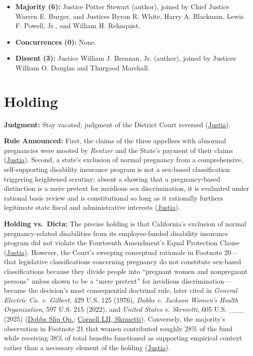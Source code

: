 \documentclass[12pt]{article}
\begin{document}
\begin{itemize}
  \item \textbf{Majority (6):} Justice Potter Stewart (author), joined by Chief Justice Warren E. Burger, and Justices Byron R. White, Harry A. Blackmun, Lewis F. Powell, Jr., and William H. Rehnquist.
  \item \textbf{Concurrences (0):} None.
  \item \textbf{Dissent (3):} Justice William J. Brennan, Jr. (author), joined by Justices William O. Douglas and Thurgood Marshall.
\end{itemize}

\section{Holding}

\textbf{Judgment:} Stay vacated; judgment of the District Court reversed (\href{https://supreme.justia.com/cases/federal/us/417/484/}{Justia}).

\textbf{Rule Announced:} First, the claims of the three appellees with abnormal pregnancies were mooted by \textit{Rentzer} and the State's payment of their claims (\href{https://supreme.justia.com/cases/federal/us/417/484/}{Justia}). Second, a state's exclusion of normal pregnancy from a comprehensive, self-supporting disability insurance program is not a sex-based classification triggering heightened scrutiny; absent a showing that a pregnancy-based distinction is a mere pretext for invidious sex discrimination, it is evaluated under rational basis review and is constitutional so long as it rationally furthers legitimate state fiscal and administrative interests (\href{https://supreme.justia.com/cases/federal/us/417/484/}{Justia}).

\textbf{Holding vs.\ Dicta:} The precise holding is that California's exclusion of normal pregnancy-related disabilities from its employee-funded disability insurance program did not violate the Fourteenth Amendment's Equal Protection Clause (\href{https://supreme.justia.com/cases/federal/us/417/484/}{Justia}). However, the Court's sweeping conceptual rationale in Footnote 20---that legislative classifications concerning pregnancy do not constitute sex-based classifications because they divide people into ``pregnant women and nonpregnant persons'' unless shown to be a ``mere pretext'' for invidious discrimination---became the decision's most consequential doctrinal rule, later cited in \textit{General Electric Co. v. Gilbert}, 429 U.S. 125 (1976), \textit{Dobbs v. Jackson Women's Health Organization}, 597 U.S. 215 (2022), and \textit{United States v. Skrmetti}, 605 U.S. \_\_\_ (2025) (\href{https://www.supremecourt.gov/opinions/21pdf/19-1392_6j37.pdf}{Dobbs Slip Op.}; \href{https://www.law.cornell.edu/supremecourt/text/23-477}{Cornell LII, Skrmetti}). Conversely, the majority's observation in Footnote 21 that women contributed roughly 28\% of the fund while receiving 38\% of total benefits functioned as supporting empirical context rather than a necessary element of the holding (\href{https://supreme.justia.com/cases/federal/us/417/484/}{Justia}).
\end{document}

